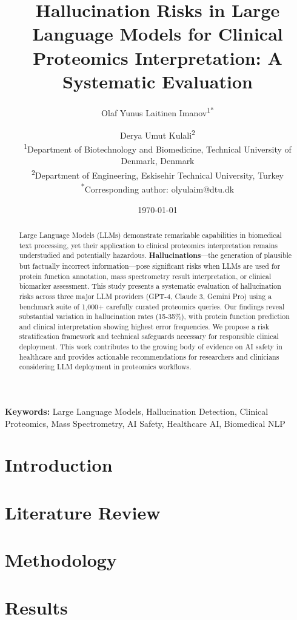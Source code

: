 \documentclass[12pt,a4paper]{article}
\title{Hallucination Risks in Large Language Models for Clinical Proteomics Interpretation: A Systematic Evaluation}
\author{
  Olaf Yunus Laitinen Imanov\textsuperscript{1*} \and
  Derya Umut Kulali\textsuperscript{2}\\
  \textsuperscript{1}Department of Biotechnology and Biomedicine, Technical University of Denmark, Denmark\\
  \textsuperscript{2}Department of Engineering, Eskisehir Technical University, Turkey\\
  \textsuperscript{*}Corresponding author: olyulaim@dtu.dk
}
\date{\today}
\begin{document}
\maketitle

\begin{abstract}
Large Language Models (LLMs) demonstrate remarkable capabilities in biomedical text processing, yet their application to clinical proteomics interpretation remains understudied and potentially hazardous. \textbf{Hallucinations}—the generation of plausible but factually incorrect information—pose significant risks when LLMs are used for protein function annotation, mass spectrometry result interpretation, or clinical biomarker assessment. This study presents a systematic evaluation of hallucination risks across three major LLM providers (GPT-4, Claude 3, Gemini Pro) using a benchmark suite of 1,000+ carefully curated proteomics queries. Our findings reveal substantial variation in hallucination rates (15-35\%), with protein function prediction and clinical interpretation showing highest error frequencies. We propose a risk stratification framework and technical safeguards necessary for responsible clinical deployment. This work contributes to the growing body of evidence on AI safety in healthcare and provides actionable recommendations for researchers and clinicians considering LLM deployment in proteomics workflows.
\end{abstract}

\textbf{Keywords:} Large Language Models, Hallucination Detection, Clinical Proteomics, Mass Spectrometry, AI Safety, Healthcare AI, Biomedical NLP

\section*{Introduction}


\section*{Literature Review}


\section*{Methodology}


\section*{Results}

\end{document}
